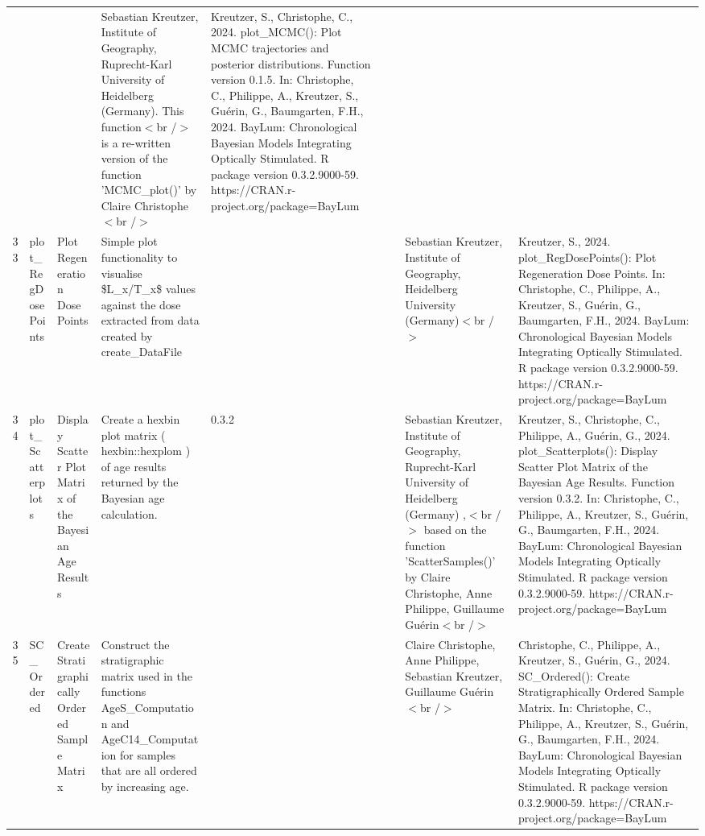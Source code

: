 \begin{table}[ht]
\begin{tabular}{rllllllll}
 &  &  & Sebastian Kreutzer, Institute of Geography, Ruprecht-Karl University of Heidelberg (Germany). This function$<$br /$>$ is a re-written version of the function 'MCMC\_plot()' by Claire Christophe$<$br /$>$ & Kreutzer, S., Christophe, C., 2024. plot\_MCMC(): Plot MCMC trajectories and posterior distributions. Function version 0.1.5. In: Christophe, C., Philippe, A., Kreutzer, S., Guérin, G., Baumgarten, F.H., 2024. BayLum: Chronological Bayesian Models Integrating Optically Stimulated. R package version 0.3.2.9000-59. https://CRAN.r-project.org/package=BayLum
 \\ 
  33 & plot\_RegDosePoints & Plot Regeneration Dose Points & Simple plot functionality to visualise \$L\_x/T\_x\$ values against the dose extracted from data created by  create\_DataFile &  &  &  & Sebastian Kreutzer, Institute of Geography, Heidelberg University (Germany)$<$br /$>$ & Kreutzer, S., 2024. plot\_RegDosePoints(): Plot Regeneration Dose Points. In: Christophe, C., Philippe, A., Kreutzer, S., Guérin, G., Baumgarten, F.H., 2024. BayLum: Chronological Bayesian Models Integrating Optically Stimulated. R package version 0.3.2.9000-59. https://CRAN.r-project.org/package=BayLum
 \\ 
  34 & plot\_Scatterplots & Display Scatter Plot Matrix of the Bayesian Age Results & Create a hexbin plot matrix ( hexbin::hexplom ) of age results returned by the Bayesian age calculation. & 0.3.2
 &  &  & Sebastian Kreutzer, Institute of Geography, Ruprecht-Karl University of Heidelberg (Germany) ,$<$br /$>$ based on the function 'ScatterSamples()' by Claire Christophe, Anne Philippe, Guillaume Guérin$<$br /$>$ & Kreutzer, S., Christophe, C., Philippe, A., Guérin, G., 2024. plot\_Scatterplots(): Display Scatter Plot Matrix of the Bayesian Age Results. Function version 0.3.2. In: Christophe, C., Philippe, A., Kreutzer, S., Guérin, G., Baumgarten, F.H., 2024. BayLum: Chronological Bayesian Models Integrating Optically Stimulated. R package version 0.3.2.9000-59. https://CRAN.r-project.org/package=BayLum
 \\ 
  35 & SC\_Ordered & Create Stratigraphically Ordered Sample Matrix & Construct the stratigraphic matrix used in the functions  AgeS\_Computation  and  AgeC14\_Computation  for samples that are all ordered by increasing age. &  &  &  & Claire Christophe, Anne Philippe, Sebastian Kreutzer, Guillaume Guérin$<$br /$>$ & Christophe, C., Philippe, A., Kreutzer, S., Guérin, G., 2024. SC\_Ordered(): Create Stratigraphically Ordered Sample Matrix. In: Christophe, C., Philippe, A., Kreutzer, S., Guérin, G., Baumgarten, F.H., 2024. BayLum: Chronological Bayesian Models Integrating Optically Stimulated. R package version 0.3.2.9000-59. https://CRAN.r-project.org/package=BayLum

\end{tabular}
\end{table}
